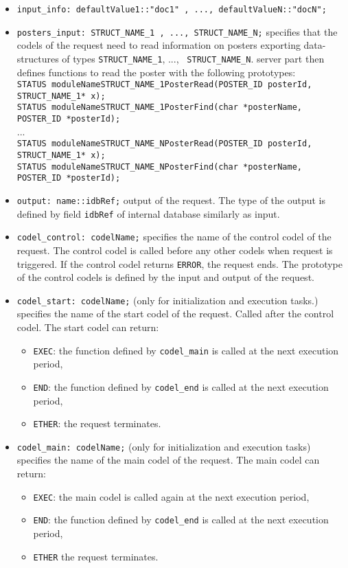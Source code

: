 \begin{itemize}
\item[]{\tt input\_info:  defaultValue1::"doc1" , ..., defaultValueN::"docN";}
\item[]{\tt posters\_input:  STRUCT\_NAME\_1 , ..., STRUCT\_NAME\_N;}
specifies that the codels of the request need to read information on posters exporting
data-structures of types {\tt STRUCT\_NAME\_1}, ..., {\tt
  STRUCT\_NAME\_N}. {\GenoM} server part then defines functions to read
the poster with the following prototypes:\\{\small
{\tt STATUS moduleNameSTRUCT\_NAME\_1PosterRead(POSTER\_ID posterId,
  STRUCT\_NAME\_1* x);}\\
{\tt STATUS moduleNameSTRUCT\_NAME\_1PosterFind(char *posterName,
  POSTER\_ID *posterId);}\\
...\\
{\tt STATUS moduleNameSTRUCT\_NAME\_NPosterRead(POSTER\_ID posterId,
  STRUCT\_NAME\_1* x);}\\
{\tt STATUS moduleNameSTRUCT\_NAME\_NPosterFind(char *posterName,
  POSTER\_ID *posterId);}\\
}
\item[]{\tt output:  name::idbRef;} output of the request. The type of
the output is defined by field {\tt idbRef} of internal database
similarly as input.\\

\item[]{\tt codel\_control: codelName;} specifies the name of the
control codel of the request. The control codel is called before
any other codels when request is triggered. If the control codel returns {\tt ERROR}, the
request ends. The prototype of the control codels is defined by the
input and output of the request.

\item[]{\tt codel\_start: codelName;} (only for initialization and execution
tasks.) specifies the name of the start codel of the request. Called
after the control codel. The start codel can return:
\begin{itemize}
\item {\tt EXEC}: the function defined by {\tt codel\_main} is called
  at the next execution period,
\item {\tt END}: the function defined by {\tt codel\_end} is called at the
  next execution period,
\item {\tt ETHER}: the request terminates.
\end{itemize}

\item[]{\tt codel\_main: codelName;} (only for initialization and execution
tasks) specifies the name of the main codel of the request. The main
codel can return:
\begin{itemize}
\item {\tt EXEC}: the main codel is called again
  at the next execution period,
\item {\tt END}: the function defined by {\tt codel\_end} is called at the
  next execution period,
\item {\tt ETHER} the request terminates.
\end{itemize}


\end{itemize}
